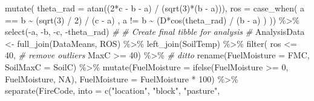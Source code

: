 \documentclass[
]{article}
\newenvironment{Shaded}{\begin{snugshade}}{\end{snugshade}}
\newcommand{\AttributeTok}[1]{\textcolor[rgb]{0.77,0.63,0.00}{#1}}
\newcommand{\CommentTok}[1]{\textcolor[rgb]{0.56,0.35,0.01}{\textit{#1}}}
\newcommand{\ConstantTok}[1]{\textcolor[rgb]{0.00,0.00,0.00}{#1}}
\newcommand{\DecValTok}[1]{\textcolor[rgb]{0.00,0.00,0.81}{#1}}
\newcommand{\FunctionTok}[1]{\textcolor[rgb]{0.00,0.00,0.00}{#1}}
\newcommand{\NormalTok}[1]{#1}
\newcommand{\OtherTok}[1]{\textcolor[rgb]{0.56,0.35,0.01}{#1}}
\newcommand{\SpecialCharTok}[1]{\textcolor[rgb]{0.00,0.00,0.00}{#1}}
\newcommand{\StringTok}[1]{\textcolor[rgb]{0.31,0.60,0.02}{#1}}
\begin{document}
\begin{Shaded}
\begin{Highlighting}[]
    \FunctionTok{mutate}\NormalTok{( }\AttributeTok{theta\_rad =} \FunctionTok{atan}\NormalTok{((}\DecValTok{2}\SpecialCharTok{*}\NormalTok{c }\SpecialCharTok{{-}}\NormalTok{ b }\SpecialCharTok{{-}}\NormalTok{ a) }\SpecialCharTok{/}\NormalTok{ (}\FunctionTok{sqrt}\NormalTok{(}\DecValTok{3}\NormalTok{)}\SpecialCharTok{*}\NormalTok{(b }\SpecialCharTok{{-}}\NormalTok{ a))), }
            \AttributeTok{ros =} \FunctionTok{case\_when}\NormalTok{(}
\NormalTok{              a }\SpecialCharTok{==}\NormalTok{ b }\SpecialCharTok{\textasciitilde{}}\NormalTok{ (}\FunctionTok{sqrt}\NormalTok{(}\DecValTok{3}\NormalTok{) }\SpecialCharTok{/} \DecValTok{2}\NormalTok{) }\SpecialCharTok{/}\NormalTok{ (c }\SpecialCharTok{{-}}\NormalTok{ a) , }
\NormalTok{              a }\SpecialCharTok{!=}\NormalTok{ b }\SpecialCharTok{\textasciitilde{}}\NormalTok{  (D}\SpecialCharTok{*}\FunctionTok{cos}\NormalTok{(theta\_rad) }\SpecialCharTok{/}\NormalTok{ (b }\SpecialCharTok{{-}}\NormalTok{ a) ) }
\NormalTok{            )) }\SpecialCharTok{\%\textgreater{}\%}
    \FunctionTok{select}\NormalTok{(}\SpecialCharTok{{-}}\NormalTok{a, }\SpecialCharTok{{-}}\NormalTok{b, }\SpecialCharTok{{-}}\NormalTok{c, }\SpecialCharTok{{-}}\NormalTok{theta\_rad)}
\CommentTok{\#}
\CommentTok{\# Create final tibble for analysis }
\CommentTok{\#}
\NormalTok{  AnalysisData  }\OtherTok{\textless{}{-}} 
    \FunctionTok{full\_join}\NormalTok{(DataMeans, ROS) }\SpecialCharTok{\%\textgreater{}\%}
              \FunctionTok{left\_join}\NormalTok{(SoilTemp) }\SpecialCharTok{\%\textgreater{}\%}
      \FunctionTok{filter}\NormalTok{( ros }\SpecialCharTok{\textless{}=} \DecValTok{40}\NormalTok{,       }\CommentTok{\# remove outliers}
\NormalTok{              MaxC }\SpecialCharTok{\textgreater{}=} \DecValTok{40}\NormalTok{) }\SpecialCharTok{\%\textgreater{}\%}  \CommentTok{\# ditto}
      \FunctionTok{rename}\NormalTok{(}\AttributeTok{FuelMoisture =}\NormalTok{ FMC, }
             \AttributeTok{SoilMaxC =}\NormalTok{ SoilC) }\SpecialCharTok{\%\textgreater{}\%}
        \FunctionTok{mutate}\NormalTok{(}\AttributeTok{FuelMoisture =} \FunctionTok{ifelse}\NormalTok{(FuelMoisture }\SpecialCharTok{\textgreater{}=} \DecValTok{0}\NormalTok{, }
\NormalTok{                                      FuelMoisture, }\ConstantTok{NA}\NormalTok{), }
               \AttributeTok{FuelMoisture =}\NormalTok{ FuelMoisture }\SpecialCharTok{*} \DecValTok{100}\NormalTok{) }\SpecialCharTok{\%\textgreater{}\%}
      \FunctionTok{separate}\NormalTok{(FireCode, }\AttributeTok{into =} \FunctionTok{c}\NormalTok{(}\StringTok{"location"}\NormalTok{, }\StringTok{"block"}\NormalTok{, }\StringTok{"pasture"}\NormalTok{, }

\end{Highlighting}
\end{Shaded}
\end{document}
